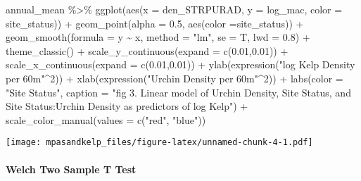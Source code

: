 \documentclass[
]{article}
\newenvironment{Shaded}{\begin{snugshade}}{\end{snugshade}}
\newcommand{\AttributeTok}[1]{\textcolor[rgb]{0.77,0.63,0.00}{#1}}
\newcommand{\DecValTok}[1]{\textcolor[rgb]{0.00,0.00,0.81}{#1}}
\newcommand{\FloatTok}[1]{\textcolor[rgb]{0.00,0.00,0.81}{#1}}
\newcommand{\FunctionTok}[1]{\textcolor[rgb]{0.00,0.00,0.00}{#1}}
\newcommand{\NormalTok}[1]{#1}
\newcommand{\SpecialCharTok}[1]{\textcolor[rgb]{0.00,0.00,0.00}{#1}}
\newcommand{\StringTok}[1]{\textcolor[rgb]{0.31,0.60,0.02}{#1}}
\begin{document}
\begin{Shaded}
\begin{Highlighting}[]
\NormalTok{annual\_mean }\SpecialCharTok{\%\textgreater{}\%} 
  \FunctionTok{ggplot}\NormalTok{(}\FunctionTok{aes}\NormalTok{(}\AttributeTok{x =}\NormalTok{ den\_STRPURAD, }\AttributeTok{y =}\NormalTok{ log\_mac, }\AttributeTok{color =}\NormalTok{ site\_status)) }\SpecialCharTok{+}
  \FunctionTok{geom\_point}\NormalTok{(}\AttributeTok{alpha =} \FloatTok{0.5}\NormalTok{, }\FunctionTok{aes}\NormalTok{(}\AttributeTok{color =}\NormalTok{site\_status)) }\SpecialCharTok{+}
  \FunctionTok{geom\_smooth}\NormalTok{(}\AttributeTok{formula =}\NormalTok{ y }\SpecialCharTok{\textasciitilde{}}\NormalTok{ x, }\AttributeTok{method =} \StringTok{"lm"}\NormalTok{, }\AttributeTok{se =}\NormalTok{ T, }\AttributeTok{lwd =} \FloatTok{0.8}\NormalTok{) }\SpecialCharTok{+}
  \FunctionTok{theme\_classic}\NormalTok{() }\SpecialCharTok{+}
  \FunctionTok{scale\_y\_continuous}\NormalTok{(}\AttributeTok{expand =} \FunctionTok{c}\NormalTok{(}\FloatTok{0.01}\NormalTok{,}\FloatTok{0.01}\NormalTok{)) }\SpecialCharTok{+}
  \FunctionTok{scale\_x\_continuous}\NormalTok{(}\AttributeTok{expand =} \FunctionTok{c}\NormalTok{(}\FloatTok{0.01}\NormalTok{,}\FloatTok{0.01}\NormalTok{)) }\SpecialCharTok{+}
  \FunctionTok{ylab}\NormalTok{(}\FunctionTok{expression}\NormalTok{(}\StringTok{"log Kelp Density per 60m"}\SpecialCharTok{\^{}}\DecValTok{2}\NormalTok{)) }\SpecialCharTok{+}
  \FunctionTok{xlab}\NormalTok{(}\FunctionTok{expression}\NormalTok{(}\StringTok{"Urchin Density per 60m"}\SpecialCharTok{\^{}}\DecValTok{2}\NormalTok{)) }\SpecialCharTok{+}
  \FunctionTok{labs}\NormalTok{(}\AttributeTok{color =} \StringTok{"Site Status"}\NormalTok{,}
       \AttributeTok{caption =} \StringTok{"fig 3. Linear model of Urchin Density, Site Status, and Site Status:Urchin Density as predictors of log Kelp"}\NormalTok{) }\SpecialCharTok{+}
  \FunctionTok{scale\_color\_manual}\NormalTok{(}\AttributeTok{values =} \FunctionTok{c}\NormalTok{(}\StringTok{"red"}\NormalTok{, }\StringTok{"blue"}\NormalTok{))}
\end{Highlighting}
\end{Shaded}

\texttt{[image: mpasandkelp\_files/figure-latex/unnamed-chunk-4-1.pdf]}

\hypertarget{welch-two-sample-t-test}{%
\paragraph{Welch Two Sample T Test}\label{welch-two-sample-t-test}}
\end{document}
